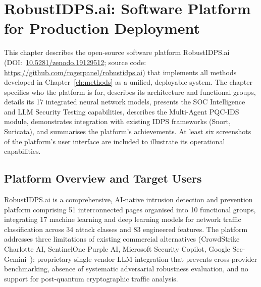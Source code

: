 
\chapter{RobustIDPS.ai: Software Platform for Production Deployment}
\label{ch:platform}

This chapter describes the open-source software platform RobustIDPS.ai~\cite{Anaedevha2026robustidps} (DOI:~\url{10.5281/zenodo.19129512}; source code: \url{https://github.com/rogerpanel/robustidps.ai}) that implements all methods developed in Chapter~\ref{ch:methods} as a unified, deployable system. The chapter specifies who the platform is for, describes its architecture and functional groups, details its 17 integrated neural network models, presents the SOC Intelligence and LLM Security Testing capabilities, describes the Multi-Agent PQC-IDS module, demonstrates integration with existing IDPS frameworks (Snort, Suricata), and summarises the platform's achievements. At least six screenshots of the platform's user interface are included to illustrate its operational capabilities.


\section{Platform Overview and Target Users}
\label{sec:platform_overview}

RobustIDPS.ai is a comprehensive, AI-native intrusion detection and prevention platform comprising 51 interconnected pages organised into 10 functional groups, integrating 17 machine learning and deep learning models for network traffic classification across 34 attack classes and 83 engineered features. The platform addresses three limitations of existing commercial alternatives (CrowdStrike Charlotte AI, SentinelOne Purple AI, Microsoft Security Copilot, Google Sec-Gemini~\cite{Smith2023}): proprietary single-vendor LLM integration that prevents cross-provider benchmarking, absence of systematic adversarial robustness evaluation, and no support for post-quantum cryptographic traffic analysis.

